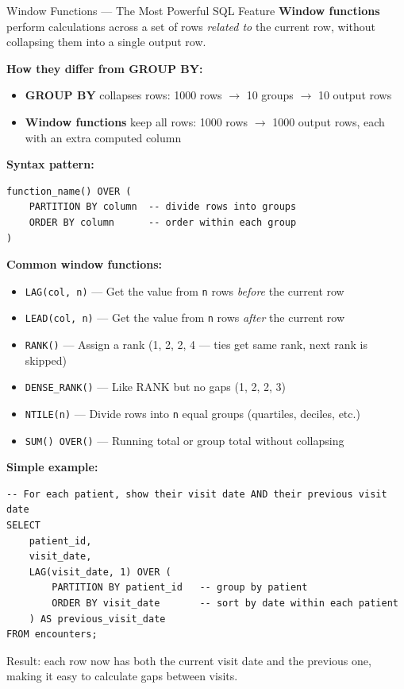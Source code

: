 \documentclass[12pt, a4paper, oneside]{report}
\begin{document}
\begin{conceptbox}{Window Functions --- The Most Powerful SQL Feature}
\textbf{Window functions} perform calculations across a set of rows \textit{related to} the current row, without collapsing them into a single output row.

\textbf{How they differ from GROUP BY:}
\begin{itemize}
    \item \textbf{GROUP BY} collapses rows: 1000 rows $\rightarrow$ 10 groups $\rightarrow$ 10 output rows
    \item \textbf{Window functions} keep all rows: 1000 rows $\rightarrow$ 1000 output rows, each with an extra computed column
\end{itemize}

\textbf{Syntax pattern:}
\begin{lstlisting}[style=sqlstyle]
function_name() OVER (
    PARTITION BY column  -- divide rows into groups
    ORDER BY column      -- order within each group
)
\end{lstlisting}

\textbf{Common window functions:}
\begin{itemize}
    \item \texttt{LAG(col, n)} --- Get the value from \texttt{n} rows \textit{before} the current row
    \item \texttt{LEAD(col, n)} --- Get the value from \texttt{n} rows \textit{after} the current row
    \item \texttt{RANK()} --- Assign a rank (1, 2, 2, 4 --- ties get same rank, next rank is skipped)
    \item \texttt{DENSE\_RANK()} --- Like RANK but no gaps (1, 2, 2, 3)
    \item \texttt{NTILE(n)} --- Divide rows into \texttt{n} equal groups (quartiles, deciles, etc.)
    \item \texttt{SUM() OVER()} --- Running total or group total without collapsing
\end{itemize}

\textbf{Simple example:}
\begin{lstlisting}[style=sqlstyle]
-- For each patient, show their visit date AND their previous visit date
SELECT
    patient_id,
    visit_date,
    LAG(visit_date, 1) OVER (
        PARTITION BY patient_id   -- group by patient
        ORDER BY visit_date       -- sort by date within each patient
    ) AS previous_visit_date
FROM encounters;
\end{lstlisting}
Result: each row now has both the current visit date and the previous one, making it easy to calculate gaps between visits.
\end{conceptbox}
\end{document}
